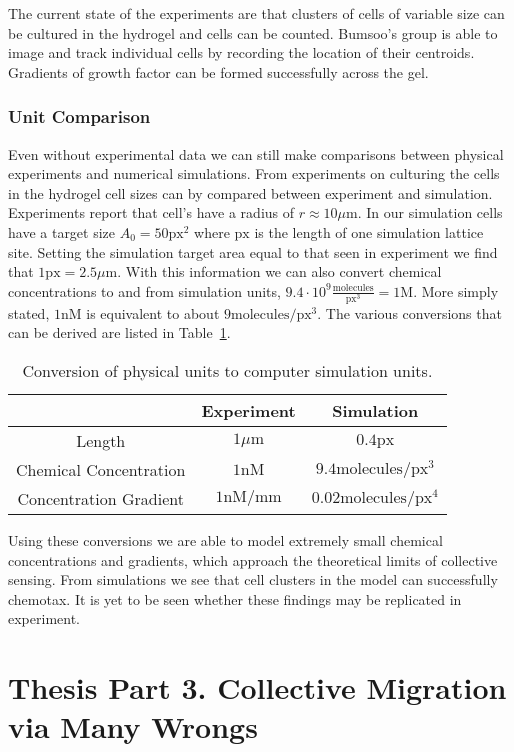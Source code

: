 \documentclass[a4paper]{article}
\begin{document}
The current state of the experiments are that clusters of cells of variable size can be cultured in the hydrogel and cells can be counted. Bumsoo's group is able to image and track individual cells by recording the location of their centroids. Gradients of growth factor can be formed successfully across the gel.

\subsubsection{Unit Comparison}

Even without experimental data we can still make comparisons between physical experiments and numerical simulations. From experiments on culturing the cells in the hydrogel cell sizes can by compared between experiment and simulation. Experiments report that cell's have a radius of $r \approx 10 \mu\text{m}$. In our simulation cells have a target size $A_0 = 50\text{px}^2$ where $\text{px}$ is the length of one simulation lattice site. Setting the simulation target area equal to that seen in experiment we find that $1\text{px} = 2.5\mu\text{m}$. With this information we can also convert chemical concentrations to and from simulation units, $9.4\cdot 10^9 \frac{\text{molecules}}{\text{px}^3} = 1 \text{M}$. More simply stated, $1 \text{nM}$ is equivalent to about
$9 \text{molecules}/\text{px}^3$.
The various conversions that can be derived are listed in Table\ \ref{units}.

\begin{table}[t]
\begin{center}
\begin{tabular}{ |c|c|c| }
    \hline
    \ & Experiment & Simulation \\ \hline
    Length & $1 \mu\text{m}$ & $0.4 \text{px}$ \\ \hline
    Chemical Concentration & $1\text{nM}$ & $9.4\text{molecules}/\text{px}^3$  \\ \hline
    Concentration Gradient & $1\text{nM}/\text{mm}$ & $0.02\text{molecules}/\text{px}^4$ \\ \hline
\end{tabular}
\caption{Conversion of physical units to computer simulation units.}
\label{units}
\end{center}
\end{table}

Using these conversions we are able to model extremely small chemical concentrations and gradients, which approach the theoretical limits of collective sensing. From simulations we see that cell clusters in the model can successfully chemotax. It is yet to be seen whether these findings may be replicated in experiment.

\section{Thesis Part 3. Collective Migration via Many Wrongs}



\end{document}
